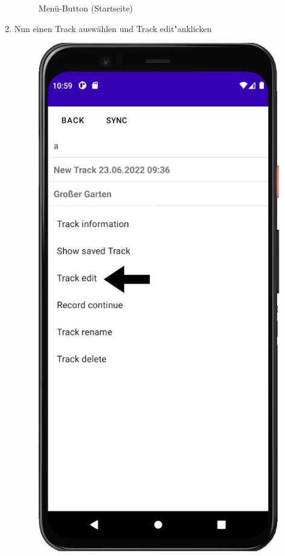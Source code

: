 \documentclass{article}
\begin{document}
\begin{enumerate}
\begin{figure}[H]
			\centering
			\caption{Menü-Button (Startseite)}
	        \end{figure}
		\item Nun einen Track auswählen und \glqq Track edit"\space anklicken
		\begin{figure}[H]
			\includegraphics[scale=1]{spoi_pic2.png}

\end{figure}
\end{enumerate}
\end{document}
